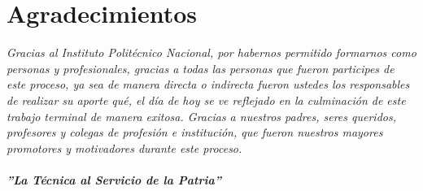 
\chapter{Agradecimientos}

\textit{Gracias al Instituto Politécnico Nacional, por habernos permitido formarnos como personas y profesionales, gracias a todas las personas que fueron participes de este proceso, ya sea de manera directa o indirecta fueron ustedes los responsables de realizar su aporte qué, el día de hoy se ve reflejado en la culminación de este trabajo terminal de manera exitosa. Gracias a nuestros padres, seres queridos, profesores y colegas de profesión e institución, que fueron nuestros mayores promotores y motivadores durante este proceso.}
\\
\\
\textbf{\textit{''La Técnica al Servicio de la Patria''}}
